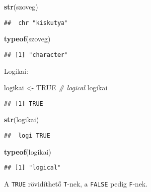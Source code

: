\documentclass[]{book}
\newenvironment{Shaded}{\begin{snugshade}}{\end{snugshade}}
\newcommand{\KeywordTok}[1]{\textcolor[rgb]{0.13,0.29,0.53}{\textbf{#1}}}
\newcommand{\StringTok}[1]{\textcolor[rgb]{0.31,0.60,0.02}{#1}}
\newcommand{\CommentTok}[1]{\textcolor[rgb]{0.56,0.35,0.01}{\textit{#1}}}
\newcommand{\OtherTok}[1]{\textcolor[rgb]{0.56,0.35,0.01}{#1}}
\newcommand{\NormalTok}[1]{#1}
\begin{document}
\begin{Shaded}
\begin{Highlighting}[]
\KeywordTok{str}\NormalTok{(szoveg)}
\end{Highlighting}
\end{Shaded}

\begin{verbatim}
##  chr "kiskutya"
\end{verbatim}

\begin{Shaded}
\begin{Highlighting}[]
\KeywordTok{typeof}\NormalTok{(szoveg)}
\end{Highlighting}
\end{Shaded}

\begin{verbatim}
## [1] "character"
\end{verbatim}

Logikai:

\begin{Shaded}
\begin{Highlighting}[]
\NormalTok{logikai <-}\StringTok{ }\OtherTok{TRUE}  \CommentTok{# logical}
\NormalTok{logikai}
\end{Highlighting}
\end{Shaded}

\begin{verbatim}
## [1] TRUE
\end{verbatim}

\begin{Shaded}
\begin{Highlighting}[]
\KeywordTok{str}\NormalTok{(logikai)}
\end{Highlighting}
\end{Shaded}

\begin{verbatim}
##  logi TRUE
\end{verbatim}

\begin{Shaded}
\begin{Highlighting}[]
\KeywordTok{typeof}\NormalTok{(logikai)}
\end{Highlighting}
\end{Shaded}

\begin{verbatim}
## [1] "logical"
\end{verbatim}

A \texttt{TRUE} rövidíthető \texttt{T}-nek, a \texttt{FALSE} pedig
\texttt{F}-nek.
\end{document}
